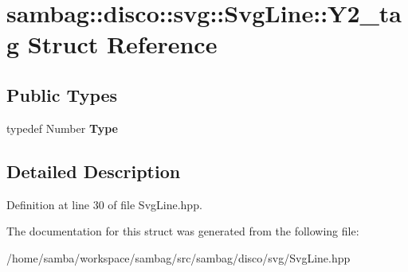 \hypertarget{structsambag_1_1disco_1_1svg_1_1_svg_line_1_1_y2__tag}{
\section{sambag::disco::svg::SvgLine::Y2\_\-tag Struct Reference}
\label{structsambag_1_1disco_1_1svg_1_1_svg_line_1_1_y2__tag}
}
\subsection*{Public Types}
\begin{DoxyCompactItemize}
\item 
\hypertarget{structsambag_1_1disco_1_1svg_1_1_svg_line_1_1_y2__tag_ad07d92130c3257ae6a37d478b77d760a}{
typedef Number {\bfseries Type}}
\label{structsambag_1_1disco_1_1svg_1_1_svg_line_1_1_y2__tag_ad07d92130c3257ae6a37d478b77d760a}

\end{DoxyCompactItemize}


\subsection{Detailed Description}


Definition at line 30 of file SvgLine.hpp.



The documentation for this struct was generated from the following file:\begin{DoxyCompactItemize}
\item 
/home/samba/workspace/sambag/src/sambag/disco/svg/SvgLine.hpp\end{DoxyCompactItemize}
